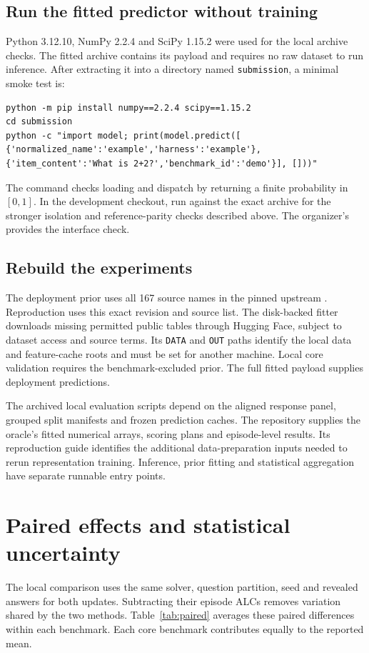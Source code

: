 \documentclass{article}
\begin{document}
\subsection{Run the fitted predictor without training}
Python 3.12.10, NumPy 2.2.4 and SciPy 1.15.2 were used for the local archive checks. The fitted archive contains its payload and requires no raw dataset to run inference. After extracting it into a directory named \texttt{submission}, a minimal smoke test is:
\begin{verbatim}
python -m pip install numpy==2.2.4 scipy==1.15.2
cd submission
python -c "import model; print(model.predict([
{'normalized_name':'example','harness':'example'},
{'item_content':'What is 2+2?','benchmark_id':'demo'}], []))"
\end{verbatim}
The command checks loading and dispatch by returning a finite probability in $[0,1]$. In the development checkout, run  against the exact archive for the stronger isolation and reference-parity checks described above. The organizer's  provides the interface check.

\subsection{Rebuild the experiments}
The deployment prior uses all 167 source names in the pinned upstream . Reproduction uses this exact revision and source list. The disk-backed fitter downloads missing permitted public tables through Hugging Face, subject to dataset access and source terms. Its \texttt{DATA} and \texttt{OUT} paths identify the local data and feature-cache roots and must be set for another machine. Local core validation requires the benchmark-excluded prior. The full fitted payload supplies deployment predictions.

The archived local evaluation scripts depend on the aligned response panel, grouped split manifests and frozen prediction caches. The repository supplies the oracle's fitted numerical arrays, scoring plans and episode-level results. Its reproduction guide identifies the additional data-preparation inputs needed to rerun representation training. Inference, prior fitting and statistical aggregation have separate runnable entry points.


\clearpage
\section{Paired effects and statistical uncertainty}\label{app:paired}
The local comparison uses the same solver, question partition, seed and revealed answers for both updates. Subtracting their episode ALCs removes variation shared by the two methods. Table~\ref{tab:paired} averages these paired differences within each benchmark. Each core benchmark contributes equally to the reported mean.
\end{document}
